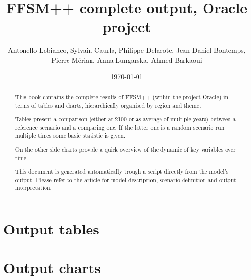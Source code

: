 \documentclass[a4paper,11pt]{paper}
\title{FFSM++ complete output, Oracle project}
\author{Antonello Lobianco, Sylvain Caurla, Philippe Delacote, Jean-Daniel Bontemps, Pierre Mérian, Anna Lungarska, Ahmed Barkaoui}
\date{\today}
\begin{document}
\maketitle

\begin{abstract}
This book contains the complete results of FFSM++ (within the project Oracle) in terms of tables and charts, hierarchically organised by region and theme.

Tables present a comparison (either at 2100 or as average of multiple years) between a reference scenario and a comparing one. If the latter one is a random scenario run multiple times some basic statistic is given.

On the other side charts provide a quick overview of the dynamic of key variables over time.

This document is generated automatically trough a script directly from the model's output. Please refer to the article for model description, scenario definition and output interpretation.

\end{abstract}

\thispagestyle{empty}
\newpage
\tableofcontents
\thispagestyle{empty}
\newpage
\part[Tables]{Output tables}

\clearpage
\newpage
\part[Charts]{Output charts}



%
\end{document}
